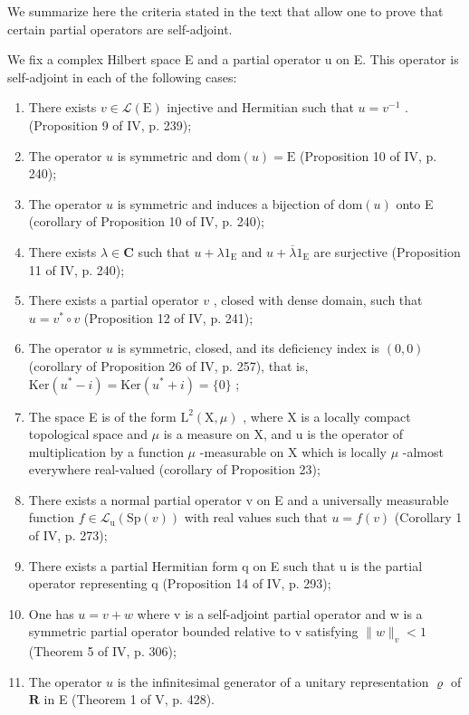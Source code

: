 
We summarize here the criteria stated in the text that allow one to prove that certain partial operators are self-adjoint.

We fix a complex Hilbert space E and a partial operator u on E. This operator is self-adjoint in each of the following cases:

\begin{enumerate}
\def\labelenumi{(\roman{enumi})}
\item
  There exists \(v \in \mathcal{L}(\mathrm{E})\) injective and Hermitian such that \(u = v^{-1}\) . (Proposition 9 of IV, p. 239);
\item
  The operator \(u\) is symmetric and \(\mathrm{dom}(u) = \mathrm{E}\) (Proposition 10 of IV, p. 240);
\item
  The operator \(u\) is symmetric and induces a bijection of \(\mathrm{dom}(u)\) onto E (corollary of Proposition 10 of IV, p. 240);
\item
  There exists \(\lambda \in \mathbf{C}\) such that \(u + \lambda 1_{\mathrm{E}}\) and \(u + \overline{\lambda} 1_{\mathrm{E}}\) are surjective (Proposition 11 of IV, p. 240);
\item
  There exists a partial operator \(v\) , closed with dense domain, such that \(u = v^{*} \circ v\) (Proposition 12 of IV, p. 241);
\item
  The operator \(u\) is symmetric, closed, and its deficiency index is \((0,0)\) (corollary of Proposition 26 of IV, p. 257), that is, \(\mathrm{Ker}(u^{*} - i) = \mathrm{Ker}(u^{*} + i) = \{0\}\) ;
\item
  The space E is of the form \(\mathrm{L}^{2}(\mathrm{X},\mu)\) , where X is a locally compact topological space and \(\mu\) is a measure on X, and u is the operator of multiplication by a function \(\mu\) -measurable on X which is locally \(\mu\) -almost everywhere real-valued (corollary of Proposition 23);
\item
  There exists a normal partial operator v on E and a universally measurable function \(f \in \mathcal{L}_{\mathrm{u}}(\mathrm{Sp}(v))\) with real values such that \(u = f(v)\) (Corollary 1 of IV, p. 273);
\item
  There exists a partial Hermitian form q on E such that u is the partial operator representing q (Proposition 14 of IV, p. 293);
\item
  One has \(u = v + w\) where v is a self-adjoint partial operator and w is a symmetric partial operator bounded relative to v satisfying \(\|w\|_{v} < 1\) (Theorem 5 of IV, p. 306);
\item
  The operator \(u\) is the infinitesimal generator of a unitary representation \(\varrho\) of \(\mathbf{R}\) in E (Theorem 1 of V, p. 428).
\end{enumerate}
